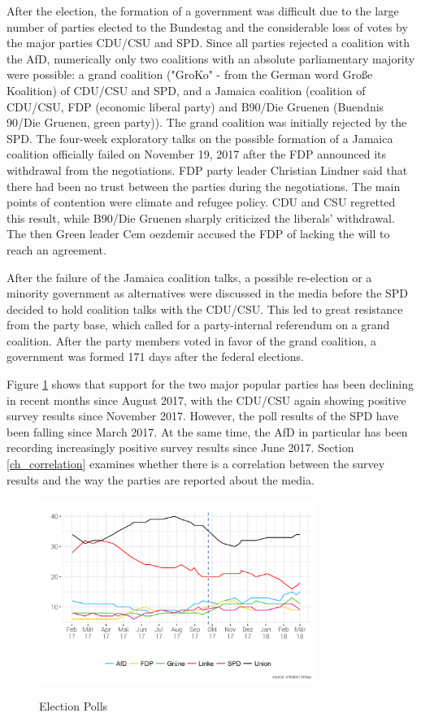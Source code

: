 \documentclass[12pt,a4paper,notitlepage]{article}
\begin{document}
After the election, the formation of a government was difficult due to the large number of parties elected to the Bundestag and the considerable loss of votes by the major parties CDU/CSU and SPD. Since all parties rejected a coalition with the AfD, numerically only two coalitions with an absolute parliamentary majority were possible: a grand coalition ("GroKo" - from the German word Große Koalition) of CDU/CSU and SPD, and a Jamaica coalition (coalition of CDU/CSU, FDP (economic liberal party) and B90/Die Gruenen (Buendnis 90/Die Gruenen, green party)). The grand coalition was initially rejected by the SPD. The four-week exploratory talks on the possible formation of a Jamaica coalition officially failed on November 19, 2017 after the FDP announced its withdrawal from the negotiations. FDP party leader Christian Lindner said that there had been no trust between the parties during the negotiations. The main points of contention were climate and refugee policy. CDU and CSU regretted this result, while B90/Die Gruenen sharply criticized the liberals' withdrawal. The then Green leader Cem oezdemir accused the FDP of lacking the will to reach an agreement.

After the failure of the Jamaica coalition talks, a possible re-election or a minority government as alternatives were discussed in the media before the SPD decided to hold coalition talks with the CDU/CSU. This led to great resistance from the party base, which called for a party-internal referendum on a grand coalition. After the party members voted in favor of the grand coalition, a government was formed 171 days after the federal elections. 

Figure \ref{fig_polls} shows that support for the two major popular parties has been declining in recent months since August 2017, with the CDU/CSU again showing positive survey results since November 2017. However, the poll results of the SPD have been falling since March 2017. At the same time, the AfD in particular has been recording increasingly positive survey results since June 2017. Section \ref{ch_correlation} examines whether there is a correlation between the survey results and the way the parties are reported about the media. 

\begin{figure}[H]
\begin{center}
	\caption{Election Polls}
	\includegraphics[width=0.8\textwidth]{figs/polls.png}
	\label{fig_polls}
	\end{center}
\end{figure}
\end{document}
